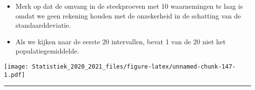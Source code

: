 \documentclass[
  12pt,dutch,coursenotes]{book}
\newenvironment{Shaded}{\begin{snugshade}}{\end{snugshade}}
\newcommand{\DataTypeTok}[1]{\textcolor[rgb]{0.13,0.29,0.53}{#1}}
\newcommand{\DecValTok}[1]{\textcolor[rgb]{0.00,0.00,0.81}{#1}}
\newcommand{\FloatTok}[1]{\textcolor[rgb]{0.00,0.00,0.81}{#1}}
\newcommand{\KeywordTok}[1]{\textcolor[rgb]{0.13,0.29,0.53}{\textbf{#1}}}
\newcommand{\NormalTok}[1]{#1}
\newcommand{\OperatorTok}[1]{\textcolor[rgb]{0.81,0.36,0.00}{\textbf{#1}}}
\newcommand{\StringTok}[1]{\textcolor[rgb]{0.31,0.60,0.02}{#1}}
\theoremstyle{definition}
\theoremstyle{definition}
\theoremstyle{definition}
\theoremstyle{remark}
\begin{document}
\begin{itemize}
\item
  Merk op dat de omvang in de steekproeven met 10 waarnemingen te laag is omdat we geen rekening houden met de onzekerheid in de schatting van de standaarddeviatie.
\item
  Als we kijken naar de eerste 20 intervallen, bevat 1 van de 20 niet het populatiegemiddelde.
\end{itemize}

\begin{Shaded}
\end{Shaded}

\texttt{[image: Statistiek\_2020\_2021\_files/figure-latex/unnamed-chunk-147-1.pdf]}

\begin{center}\rule{0.5\linewidth}{0.5pt}\end{center}
\end{document}
